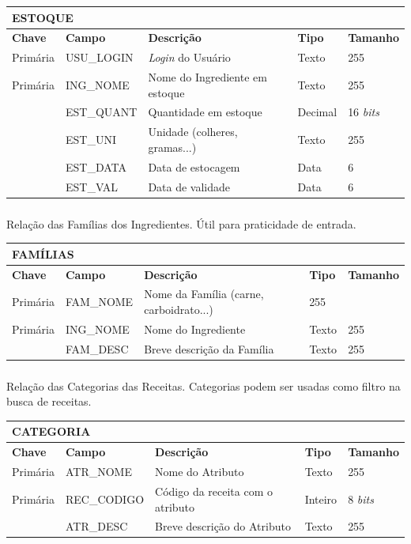 \documentclass[paper=a4, fontsize=11pt]{scrartcl}	%
\numberwithin{equation}{section}															%
\numberwithin{figure}{section}																%
\numberwithin{table}{section}																%
\begin{document}
\begin{center}
\begin{tabular}{ l  l  l  l l }
  \multicolumn{5}{l}{\textbf{ESTOQUE}} \\
  \hline
  \textbf{Chave} & \textbf{Campo} & \textbf{Descrição} & \textbf{Tipo} & \textbf{Tamanho} \\
  \cline{1-5}
  Primária & USU\_LOGIN & \emph{Login} do Usuário & Texto & 255 \\
  Primária & ING\_NOME & Nome do Ingrediente em estoque & Texto & 255 \\
   & EST\_QUANT & Quantidade em estoque & Decimal & 16 \emph{bits} \\
   & EST\_UNI & Unidade (colheres, gramas...) & Texto & 255 \\
   & EST\_DATA & Data de estocagem & Data & 6 \\
   & EST\_VAL & Data de validade & Data & 6
\end{tabular}
\end{center}

\vfill

\subsubsection{} Relação das Famílias dos Ingredientes. Útil para praticidade de entrada.

\begin{center}
\begin{tabular}{ l  l  l  l l }
  \multicolumn{5}{l}{\textbf{FAMÍLIAS}} \\
  \hline
  \textbf{Chave} & \textbf{Campo} & \textbf{Descrição} & \textbf{Tipo} & \textbf{Tamanho} \\
  \cline{1-5}
  Primária & FAM\_NOME & Nome da Família (carne, carboidrato...) & 255 \\
  Primária & ING\_NOME & Nome do Ingrediente & Texto & 255 \\
  & FAM\_DESC & Breve descrição da Família & Texto & 255
\end{tabular}
\end{center}

\newpage

\subsubsection{} Relação das Categorias das Receitas. Categorias podem ser usadas como filtro na busca de receitas.

\begin{center}
\begin{tabular}{ l  l  l  l l }
  \multicolumn{5}{l}{\textbf{CATEGORIA}} \\
  \hline
  \textbf{Chave} & \textbf{Campo} & \textbf{Descrição} & \textbf{Tipo} & \textbf{Tamanho} \\
  \cline{1-5}
  Primária & ATR\_NOME & Nome do Atributo & Texto & 255 \\
  Primária & REC\_CODIGO & Código da receita com o atributo & Inteiro & 8 \emph{bits} \\
   & ATR\_DESC & Breve descrição do Atributo & Texto & 255
\end{tabular}
\end{center}
\end{document}
